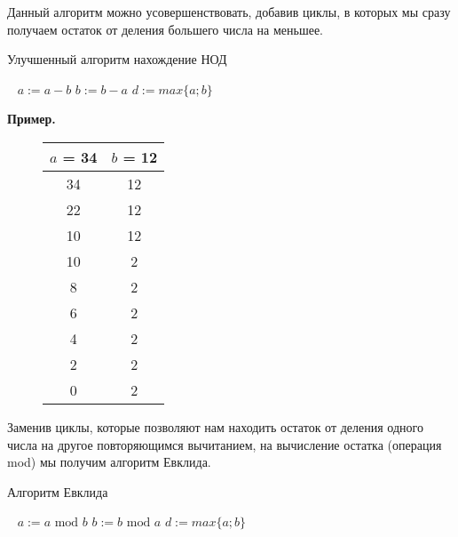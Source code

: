 \documentclass[russian]{lecture-notes}
\begin{document}
Данный алгоритм можно усовершенствовать, добавив циклы, в которых мы сразу получаем остаток от деления большего числа на меньшее.


\begin{algorithm}[H]
	\caption{Улучшенный алгоритм нахождение НОД}
	\begin{algorithmic}[1]
	    \
    	        \State $a := a - b$
    	    \EndWhile
    	        \State $b := b - a$
    	    \EndWhile
	    \EndWhile
	    \State $d := max \{a;b\}$
	\end{algorithmic}
	\label{alg:3}
\end{algorithm}

\textbf{Пример.}
\begin{figure}[h!]
    \centering
    \begin{tabular}{| c | c |}
    \hline
    $a$ = 34 & $b$ = 12\\
    \hline
        34 & 12\\
        22 & 12 \\
        10 & 12 \\
        10 & 2 \\
        8 & 2 \\
        6 & 2 \\
        4 & 2 \\
        2 & 2 \\
        0 & 2 \\
    \hline
    \end{tabular}
\end{figure}

Заменив циклы, которые позволяют нам находить остаток от деления одного числа на другое повторяющимся вычитанием, на вычисление остатка (операция mod) мы получим алгоритм Евклида.

\begin{algorithm}[h!]
	\caption{Алгоритм Евклида}
	\begin{algorithmic}[1]
	    \
    	        \State $a := a \text{ mod } b$
    	    \EndIf
    	        \State $b := b \text{ mod } a$
    	    \EndIf
	    \EndWhile
	    \State $d := max \{a;b\}$
	\end{algorithmic}
\end{algorithm}

\newpage
\end{document}

